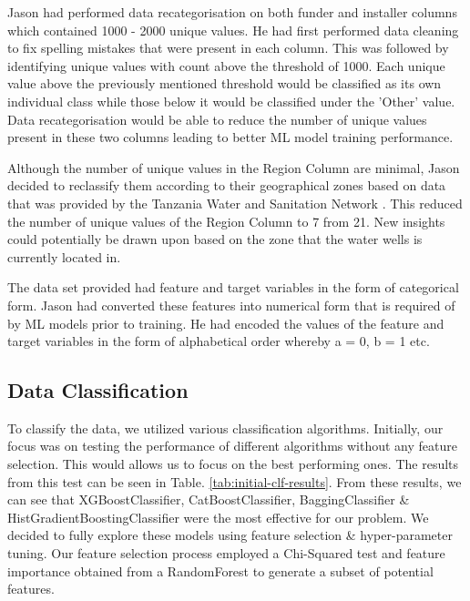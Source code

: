 \documentclass[conference]{IEEEtran}
\begin{document}
Jason had performed data recategorisation on both funder and installer columns which contained 1000 - 2000 unique values. He had first performed data cleaning to fix spelling mistakes that were present in each column. This was followed by identifying unique values with count above the threshold of 1000. Each unique value above the previously mentioned threshold would be classified as its own individual class while those below it would be classified under the 'Other' value. Data recategorisation would be able to reduce the number of unique values present in these two columns leading to better ML model training performance.

Although the number of unique values in the Region Column are minimal, Jason decided to reclassify them according to their geographical zones based on data that was provided by the Tanzania Water and Sanitation Network \cite{tawasanet}. This reduced the number of unique values of the Region Column to 7 from 21. New insights could potentially be drawn upon  based on the zone that the water wells is currently located in.

The data set provided had feature and target variables in the form of categorical form. Jason had converted these features into numerical form that is required of by ML models prior to training. He had encoded the values of the feature and target variables in the form of alphabetical order whereby a = 0, b = 1 etc. 

\subsection{Data Classification}

 To classify the data, we utilized various classification algorithms. Initially, our focus was on testing the performance of different algorithms without any feature selection. This would allows us to focus on the best performing ones. The results from this test can be seen in Table. \ref{tab:initial-clf-results}. From these results, we can see that XGBoostClassifier, CatBoostClassifier, BaggingClassifier \& HistGradientBoostingClassifier were the most effective for our problem. We decided to fully explore these models using feature selection \& hyper-parameter tuning. Our feature selection process employed a Chi-Squared test and feature importance obtained from a RandomForest to generate a subset of potential features.
\end{document}
